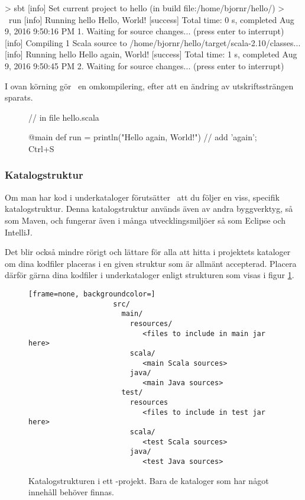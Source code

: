 \begin{REPLnonum}
> sbt
[info] Set current project to hello (in build file:/home/bjornr/hello/)
> ~run
[info] Running hello
Hello, World!
[success] Total time: 0 s, completed Aug 9, 2016 9:50:16 PM
1. Waiting for source changes... (press enter to interrupt)
[info] Compiling 1 Scala source to /home/bjornr/hello/target/scala-2.10/classes...
[info] Running hello
Hello again, World!
[success] Total time: 1 s, completed Aug 9, 2016 9:50:45 PM
2. Waiting for source changes... (press enter to interrupt)
\end{REPLnonum}

\noindent I ovan körning gör \sbt\ en omkompilering, efter att en ändring av utskriftssträngen sparats.
\begin{figure}[H]
\begin{Code}
// in file hello.scala

@main def run = println("Hello again, World!") // add 'again'; Ctrl+S
\end{Code}
\end{figure}

\subsubsection{Katalogstruktur}

Om man har kod i underkataloger förutsätter \sbt\ att du följer en viss, specifik katalogstruktur. Denna katalogstruktur används även av andra byggverktyg, så som Maven, och fungerar även i många utvecklingsmiljöer så som Eclipse och IntelliJ.

Det blir också mindre rörigt och lättare för alla att hitta i projektets kataloger om dina kodfiler placeras i en given struktur som är allmänt accepterad.
Placera därför gärna dina kodfiler i underkataloger enligt strukturen som visas i figur \ref{fig:sbt:dir-structure}.

\begin{figure}[H]
\centering

\begin{lstlisting}[frame=none, backgroundcolor=]
					src/
					  main/
					    resources/
					       <files to include in main jar here>
					    scala/
					       <main Scala sources>
					    java/
					       <main Java sources>
					  test/
					    resources
					       <files to include in test jar here>
					    scala/
					       <test Scala sources>
					    java/
					       <test Java sources>
\end{lstlisting}

\caption{Katalogstrukturen i ett \sbt-projekt. Bara de kataloger som har något innehåll behöver finnas.}
\label{fig:sbt:dir-structure}
\end{figure}

